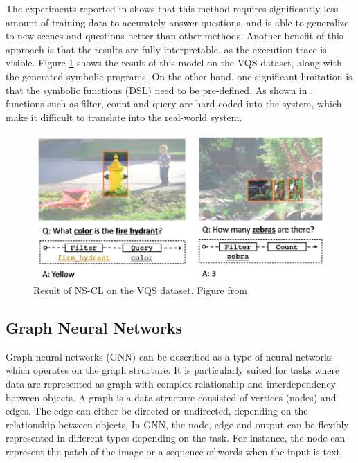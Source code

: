 \documentclass[journal]{IEEEtran}
\begin{document}
The experiments reported in \cite{Mao2019NeuroSymbolic} shows that this method requires significantly less amount of training data to accurately answer questions, 
and is able to generalize to new scenes and questions better than other methods. 
Another benefit of this approach is that the results are fully interpretable, as the execution trace is visible.
Figure \ref{nscl} shows the result of this model on the VQS dataset, along with the generated symbolic programs. 
On the other hand, one significant limitation is that the symbolic functions (DSL) need to be pre-defined. 
As shown in \cite{Mao2019NeuroSymbolic}, functions such as filter, count and query are hard-coded into the system, 
which make it difficult to translate into the real-world system.

\begin{figure}[htb]
  \includegraphics[width=\linewidth]{nscl.png}
  \caption{Result of NS-CL on the VQS dataset. Figure from \cite{Mao2019NeuroSymbolic}}
  \label{nscl}
\end{figure}

\subsection{Graph Neural Networks}

Graph neural networks (GNN) can be described as a type of neural networks which operates on the graph structure.
It is particularly suited for tasks where data are represented as graph with complex relationship and interdependency between objects.
A graph is a data structure consisted of vertices (nodes) and edges.
The edge can either be directed or undirected, depending on the relationship between objects, 
In GNN, the node, edge and output can be flexibly represented in different types depending on the task. 
For instance, the node can represent the patch of the image or a sequence of words when the input is text.
\end{document}
